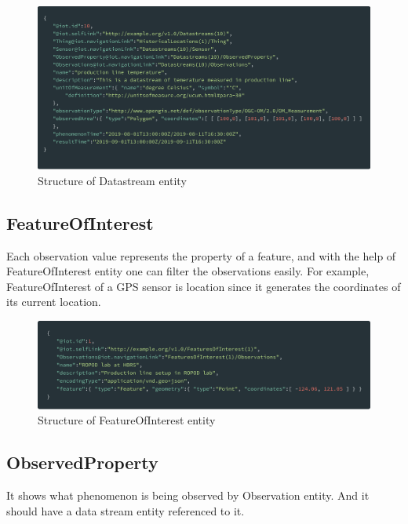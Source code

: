 	\begin{figure}[!htbp] 
		\begin{center}
			\includegraphics[scale=0.1]{./images/png/ogc/datastream}	
			\caption{Structure of Datastream entity}	
			\label{fig:datastream}	
		\end{center}
	\end{figure}

	\subsection{FeatureOfInterest}
	Each observation value represents the property of a feature, and with the help of FeatureOfInterest entity one can filter the observations easily. For example, FeatureOfInterest of a GPS sensor is location since it generates the coordinates of its current location.
	
	\begin{figure}[!htbp] 
		\begin{center}
			\includegraphics[scale=0.1]{./images/png/ogc/featureofinterest}	
			\caption{Structure of FeatureOfInterest entity}	
			\label{fig:featureofinterest}	
		\end{center}
	\end{figure}
	\newpage
	\subsection{ObservedProperty}
	It shows what phenomenon is being observed by Observation entity. And it should have a data stream entity referenced to it.
	
